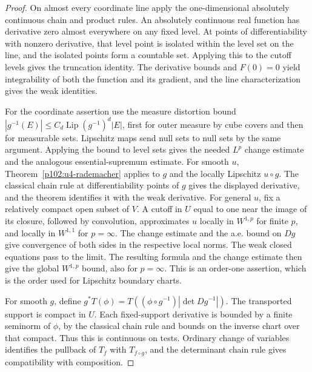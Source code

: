 \documentclass[11pt,oneside,openany]{book}
\theoremstyle{definition}
\theoremstyle{remark}
\begin{document}
\begin{proof}
On almost every coordinate line apply the one-dimensional absolutely continuous chain and product rules. An absolutely continuous real function has derivative zero almost everywhere on any fixed level. At points of differentiability with nonzero derivative, that level point is isolated within the level set on the line, and the isolated points form a countable set. Applying this to the cutoff levels gives the truncation identity. The derivative bounds and \(F(0)=0\) yield integrability of both the function and its gradient, and the line characterization gives the weak identities.

For the coordinate assertion use the measure distortion bound \(|g^{-1}(E)|\leq C_d\operatorname{Lip}(g^{-1})^d |E|\), first for outer measure by cube covers and then for measurable sets. Lipschitz maps send null sets to null sets by the same argument. Applying the bound to level sets gives the needed \(L^p\) change estimate and the analogous essential-supremum estimate. For smooth \(u\), Theorem~\ref{p102:u4-rademacher} applies to \(g\) and the locally Lipschitz \(u\circ g\). The classical chain rule at differentiability points of \(g\) gives the displayed derivative, and the theorem identifies it with the weak derivative. For general \(u\), fix a relatively compact open subset of \(V\). A cutoff in \(U\) equal to one near the image of its closure, followed by convolution, approximates \(u\) locally in \(W^{1,p}\) for finite \(p\), and locally in \(W^{1,1}\) for \(p=\infty\). The change estimate and the a.e. bound on \(Dg\) give convergence of both sides in the respective local norms. The weak closed equations pass to the limit. The resulting formula and the change estimate then give the global \(W^{1,p}\) bound, also for \(p=\infty\). This is an order-one assertion, which is the order used for Lipschitz boundary charts.

For smooth \(g\), define \(g^*T(\phi)=T((\phi\circ g^{-1})|\det Dg^{-1}|)\). The transported support is compact in \(U\). Each fixed-support derivative is bounded by a finite seminorm of \(\phi\), by the classical chain rule and bounds on the inverse chart over that compact. Thus this is continuous on tests. Ordinary change of variables identifies the pullback of \(T_f\) with \(T_{f\circ g}\), and the determinant chain rule gives compatibility with composition.
\end{proof}
\end{document}
